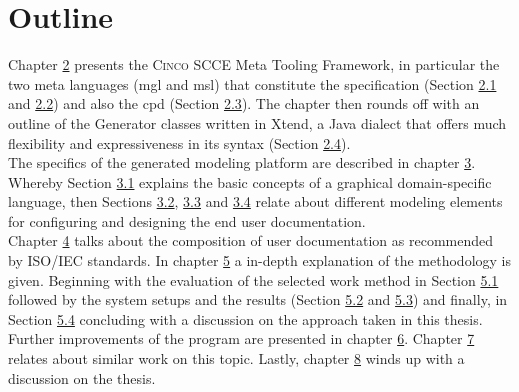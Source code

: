 \section{Outline}
Chapter \hyperref[ch:DSL]{2} presents the \textsc{Cinco} SCCE Meta Tooling Framework, in particular the two meta languages (\acrfull{mgl} and \acrfull{msl}) that constitute the specification (Section \hyperref[sec:MGL]{2.1} and \hyperref[sec:MSL]{2.2}) and also the \acrfull{cpd} (Section \hyperref[sec:CPD]{2.3}). The chapter then rounds off with an outline of the Generator classes written in Xtend, a Java dialect that offers much flexibility and expressiveness in its syntax (Section \hyperref[sec:GEN]{2.4}).\\The specifics of the generated modeling platform are described in chapter \hyperref[ch:CP]{3}. Whereby Section \hyperref[sec:gDSL]{3.1} explains the basic concepts of a graphical domain-specific language, then Sections \hyperref[sec:ModElem]{3.2}, \hyperref[sec:FuncElem]{3.3} and \hyperref[sec:ConfElem]{3.4} relate about different modeling elements for configuring and designing the end user documentation.\\Chapter \hyperref[ch:userDoc]{4} talks about the composition of user documentation as recommended by ISO/IEC standards. In chapter \hyperref[ch:eval]{5} a in-depth explanation of the methodology is given. Beginning with the evaluation of the selected work method in Section \hyperref[sec:meth]{5.1} followed by the system setups and the results (Section \hyperref[sec:setup]{5.2} and \hyperref[sec:res]{5.3}) and finally, in Section \hyperref[sec:disc]{5.4} concluding with a discussion on the approach taken in this thesis.\\
Further improvements of the program are presented in chapter \hyperref[ch:futwork]{6}. Chapter \hyperref[ch:relwork]{7} relates about similar work on this topic. Lastly, chapter \hyperref[ch:concl]{8} winds up with a discussion on the thesis.
